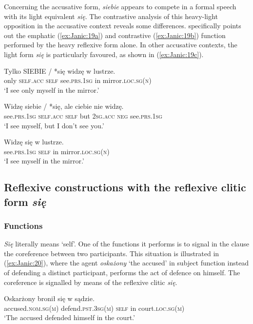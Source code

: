 \documentclass[output=paper]{langscibook}
\begin{document}
Concerning the accusative form, \textit{siebie} appears to compete in a formal speech with its light equivalent \textit{się}. The contrastive analysis of this heavy-light opposition in the accusative context reveals some differences. \citet{Sadowska2012} specifically points out the emphatic (\ref{ex:Janic:19a}) and contrastive (\ref{ex:Janic:19b}) function performed by the heavy reflexive form alone. In other accusative contexts, the light form \textit{się} is particularly favoured, as shown in (\ref{ex:Janic:19c}).

\ea \label{ex:Janic:19}
\ea \label{ex:Janic:19a}
\gll Tylko	\textsc{SIEBIE}	/	*się 	widzę		 w	lustrze.\\
		only	\textsc{self.acc} { } \textsc{self}	see.\textsc{prs.1sg}	in	mirror.\textsc{loc.sg(n)}\\
\glt ‘I see only myself in the mirror.’ 
	
\ex \label{ex:Janic:19b}
\gll Widzę	 siebie	/	 *się,	 ale	 ciebie		 nie widzę. \\
	 see.\textsc{prs.1sg}	 \textsc{self.acc} { }	\textsc{self}	but	 \textsc{2sg.acc}	\textsc{neg}	see.\textsc{prs.1sg}	\\
\glt ‘I see myself, but I don’t see you.’ 
	
\ex \label{ex:Janic:19c}
\gll Widzę się	 w	lustrze.\\
		see.\textsc{prs.1sg}	\textsc{self}	in	mirror.\textsc{loc.sg(n)}\\
\glt ‘I see myself in the mirror.’

\z 
\z 


\subsection{Reflexive constructions with the reflexive clitic form \textit{się}} \label{sec:Janic:3.2}
\subsubsection{Functions} \label{sec:Janic:3.2.1}

\textit{Się} literally means ‘self’. One of the functions it performs is to signal in the clause the coreference between two participants. This situation is illustrated in (\ref{ex:Janic:20}), where the agent \textit{oskażony} ‘the accused’ in subject function instead of defending a distinct participant, performs the act of defence on himself. The coreference is signalled by means of the reflexive clitic \textit{się}.

\ea \label{ex:Janic:20}
\gll Oskarżony	 bronił	 się	 w	sądzie.\\
	 accused.\textsc{nom.sg(m)}	defend.\textsc{pst.3sg(m)}	\textsc{self}	in	court.\textsc{loc.sg(m)}\\	
\glt ‘The accused defended himself in the court.’
\z 
	
\end{document}
